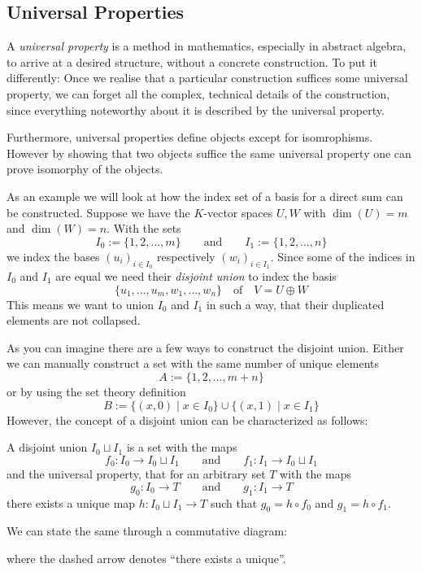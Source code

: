 \subsection{Universal Properties}
A \emph{universal property} is a method in mathematics, especially in abstract algebra, to arrive at a desired structure, without a concrete construction.
To put it differently: Once we realise that a particular construction suffices some universal property, we can forget all the complex, technical details of the construction, since everything noteworthy about it is described by the universal property.

Furthermore, universal properties define objects except for isomrophisms.
However by showing that two objects suffice the same universal property one can prove isomorphy of the objects.

As an example we will look at how the index set of a basis for a direct sum can be constructed.
Suppose we have the \(K\)-vector spaces \(U, W\) with \(\dim(U) = m\) and \(\dim(W) = n\).
With the sets
\[I_0 := \{1, 2, \ldots, m\} \qquad\text{and}\qquad I_1 := \{1, 2, \ldots, n\}\]
we index the bases \((u_i)_{i \in I_0}\) respectively \((w_i)_{i \in I_1}\).
Since some of the indices in \(I_0\) and \(I_1\) are equal we need their \emph{disjoint union} to index the basis
\[\{u_1, \ldots, u_m, w_1, \ldots, w_n\} \quad\text{of}\quad V = U \oplus W\]
This means we want to union \(I_0\) and \(I_1\) in such a way, that their duplicated elements are not collapsed.

As you can imagine there are a few ways to construct the disjoint union.
Either we can manually construct a set with the same number of unique elements
\[A := \{1, 2, \ldots, m + n\}\]
or by using the set theory definition
\[B := \{(x, 0) \mid x \in I_0\} \cup \{(x, 1) \mid x \in I_1\}\]
However, the concept of a disjoint union can be characterized as follows:

A disjoint union \(I_0 \sqcup I_1\) is a set with the maps
\[f_0: I_0 \to I_0 \sqcup I_1 \qquad\text{and}\qquad f_1: I_1 \to I_0 \sqcup I_1\]
and the universal property, that for an arbitrary set \(T\) with the maps
\[g_0: I_0 \to T\qquad\text{and}\qquad g_1: I_1 \to T\]
there exists a unique map \(h: I_0 \sqcup I_1 \to T\) such that \(g_0 = h \circ f_0\) and \(g_1 = h \circ f_1\).

We can state the same through a commutative diagram:
\begin{center}
   
\end{center}
where the dashed arrow denotes ``there exists a unique''.

